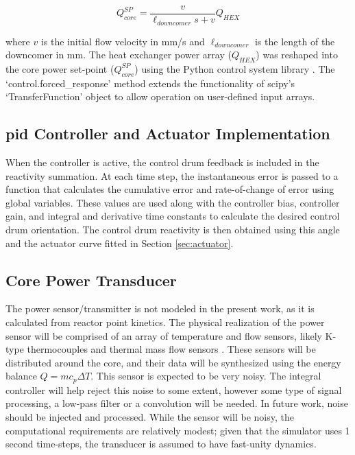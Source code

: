 \begin{equation}
    Q_{core}^{SP} = \frac{v}{\ell_{downcomer}s+v} Q_{HEX}    
\end{equation}

where $v$ is the initial flow velocity in mm/s and $\ell_{downcomer}$ is the length of the downcomer in mm. The heat exchanger power array ($Q_{HEX}$) was reshaped into the core power set-point ($Q_{core}^{SP}$) using the Python control system library \cite{ct}. The `control.forced\_response' method extends the functionality of scipy's `TransferFunction' object to allow operation on user-defined input arrays.

\subsection{\texorpdfstring{\acs{pid}}{PID} Controller and Actuator Implementation}
When the controller is active, the control drum feedback is included in the reactivity summation. At each time step, the instantaneous error is passed to a function that calculates the cumulative error and rate-of-change of error using global variables. These values are used along with the controller bias, controller gain, and integral and derivative time constants to calculate the desired control drum orientation. The control drum reactivity is then obtained using this angle and the actuator curve fitted in Section \ref{sec:actuator}. 

\subsection{Core Power Transducer}
The power sensor/transmitter is not modeled in the present work, as it is calculated from reactor point kinetics. The physical realization of the power sensor will be comprised of an array of temperature and flow sensors, likely K-type thermocouples and thermal mass flow sensors \cite{Instrumentation}. These sensors will be distributed around the core, and their data will be synthesized using the energy balance $Q = mc_p\Delta T$. This sensor is expected to be very noisy. The integral controller will help reject this noise to some extent, however some type of signal processing, \eg a low-pass filter or a convolution will be needed. In future work, noise should be injected and processed. While the sensor will be noisy, the computational requirements are relatively modest; given that the simulator uses 1 second time-steps, the transducer is assumed to have fast-unity dynamics.